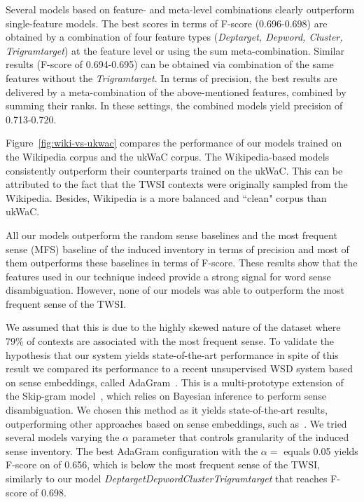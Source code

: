 \documentclass[11pt]{article}
\begin{document}
Several models based on feature- and meta-level combinations clearly outperform single-feature models. The best scores in terms of F-score (0.696-0.698) are obtained by a combination of four feature types (\textit{Deptarget, Depword, Cluster, Trigramtarget}) at the feature level or using the sum meta-combination. Similar results (F-score of 0.694-0.695) can be obtained via combination of the same features without the \textit{Trigramtarget}. In terms of precision, the best results are delivered by a meta-combination  of the above-mentioned features, combined by summing their ranks. In these settings, the combined models yield precision of 0.713-0.720.

Figure~\ref{fig:wiki-vs-ukwac} compares the performance of our models trained on the Wikipedia corpus and the ukWaC corpus. The Wikipedia-based models consistently outperform their counterparts trained on the ukWaC. This can be attributed to the fact that the TWSI contexts were originally sampled from the Wikipedia. Besides, Wikipedia is a more balanced and ``clean" corpus than ukWaC. 

All our models outperform the random sense baselines and the most frequent sense (MFS) baseline of the induced inventory in terms of precision and most of them outperforms these baselines in terms of F-score. These results show that the features used in our technique indeed provide a strong signal for  word sense disambiguation. However, none of our models was able to outperform the most frequent sense of the TWSI. 

We assumed that this is  due to the highly skewed nature of the dataset where 79\% of contexts are associated with the most frequent sense. To validate the hypothesis that our system yields state-of-the-art performance in spite of this result we compared its performance to a recent unsupervised WSD system based on sense embeddings, called AdaGram~\cite{bartunov2015breaking}. This is a multi-prototype extension of the Skip-gram model~\cite{mikolov2013efficient}, which relies on Bayesian inference to perform sense disambiguation. We chosen this method as it yields state-of-the-art results, outperforming other approaches based on sense embeddings, such as~\cite{neelakantanefficient}. We tried several models varying the $\alpha$ parameter that controls granularity of the induced sense inventory. The best AdaGram configuration with the $\alpha=$ equals 0.05 yields F-score on of 0.656, which is below the most frequent sense of the TWSI, similarly to our model \textit{DeptargetDepwordClusterTrigramtarget} that reaches F-score of 0.698.  
\end{document}
